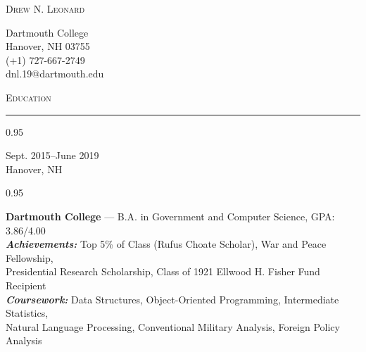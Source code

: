\documentclass[a4paper,9pt]{article}
\newcommand{\mainMarginBottom}{\vspace*{1.5pt}}
\newcommand{\newLine}{\\}
\newcommand{\doubleColumnGap}{\hspace{4mm}}
\newcommand{\sectionMarginTopBottom}{\vspace*{7.5pt}}
\newcommand{\sectionMarginBetweenAdd}{\vspace{20pt}}
\newcommand{\mainLineSpacing}{0.95}
\newcommand{\titleMarginBelow}{\vspace*{2ex}}
\def\hrulefill{\leavevmode\leaders\hrule height 1.75pt\hfill\kern0pt}
\begin{document}
\begin{minipage}[b]{0.70\linewidth}
  {\fontsize{35}{42}\selectfont \textsc{Drew N. Leonard}}
\end{minipage}
\begin{minipage}[b]{0.25\linewidth}
  \begin{flushright}
    \begin{small}
      Dartmouth College
      \newLine{}
      \mainMarginBottom{}
      Hanover, NH 03755
      \newLine{}
      \mainMarginBottom{}
      (+1) 727-667-2749
      \newLine{}
      \mainMarginBottom{}
      dnl.19@dartmouth.edu
    \end{small}
  \end{flushright}
\end{minipage}

\titleMarginBelow{}
\sectionMarginBetweenAdd{}

\hspace*{12pt}\textsc{\fontsize{20}{24}\selectfont Education}\hspace*{14pt}\hrulefill
\sectionMarginTopBottom{}

\begin{minipage}[t]{0.20\linewidth}
  \begin{small}
    \begin{spacing}\mainLineSpacing{}
      \begin{flushright}
        Sept. 2015--June 2019
        \newLine{}
        \mainMarginBottom{}
        Hanover, NH
      \end{flushright}
    \end{spacing}
  \end{small}
\end{minipage}
\doubleColumnGap{}
\begin{minipage}[t]{0.75\linewidth}
  \begin{small}
    \begin{spacing}\mainLineSpacing{}
      \begin{flushleft}
        \textbf{Dartmouth College} --- B.A. in Government and Computer Science, GPA: 3.86/4.00
        \newLine{}
        \mainMarginBottom{}
        \textit{\textbf{Achievements:}} Top 5\% of Class (Rufus Choate Scholar), War and Peace Fellowship,\\ Presidential Research Scholarship, Class of 1921 Ellwood H. Fisher Fund Recipient
        \newLine{}
        \mainMarginBottom{}
        \textit{\textbf{Coursework:}} Data Structures, Object-Oriented Programming, Intermediate Statistics,
        \\ Natural Language Processing, Conventional Military Analysis, Foreign Policy Analysis
      \end{flushleft}
    \end{spacing}
  \end{small}
\end{minipage}
\end{document}
